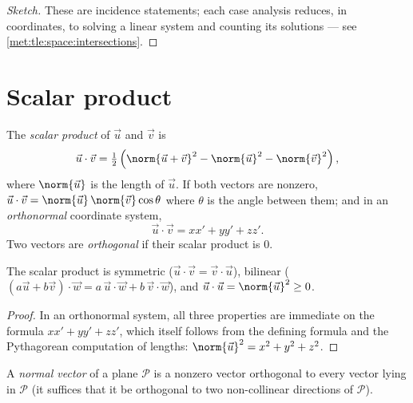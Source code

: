 \begin{proof}[Sketch]
These are incidence statements; each case analysis reduces, in coordinates,
to solving a linear system and counting its solutions --- see
\cref{met:tle:space:intersections}.
\end{proof}

\section{Scalar product}

\begin{definition}\label{def:tle:space:dot}
The \emph{scalar product} of $\vec u$ and $\vec v$ is
\[
\vec u \cdot \vec v = \tfrac12\left(\norm{\vec u + \vec v}^2
- \norm{\vec u}^2 - \norm{\vec v}^2\right),
\]
where $\norm{\vec u}$ is the length of $\vec u$. If both vectors are
nonzero, $\vec u \cdot \vec v = \norm{\vec u}\,\norm{\vec v}\cos\theta$
where $\theta$ is the angle between them; and in an \emph{orthonormal}
coordinate system,
\[
\vec u \cdot \vec v = xx' + yy' + zz' .
\]
Two vectors are \emph{orthogonal} if their scalar product is $0$.
\end{definition}

\begin{proposition}[Properties]\label{prop:tle:space:dotprops}
The scalar product is symmetric ($\vec u\cdot\vec v = \vec v\cdot\vec u$),
bilinear ($(a\vec u + b\vec v)\cdot \vec w = a\,\vec u\cdot\vec w +
b\,\vec v\cdot \vec w$), and
$\vec u \cdot \vec u = \norm{\vec u}^2 \geq 0$.
\end{proposition}

\begin{proof}
In an orthonormal system, all three properties are immediate on the formula
$xx' + yy' + zz'$, which itself follows from the defining formula and the
Pythagorean computation of lengths:
$\norm{\vec u}^2 = x^2 + y^2 + z^2$.
\end{proof}

\begin{definition}\label{def:tle:space:normal}
A \emph{normal vector} of a plane $\mathcal P$ is a
nonzero vector orthogonal to every vector lying in $\mathcal P$ (it
suffices that it be orthogonal to two non-collinear directions of
$\mathcal P$).
\end{definition}

